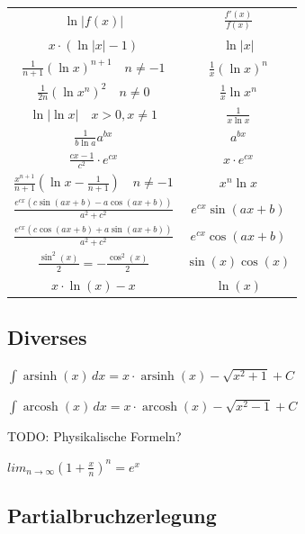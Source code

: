 \begin{center}
\begin{tabular}{c||c}
                $ \ln {| f(x) |} $   &   $ \frac{f'(x)}{f(x)} $ \\
                $ x \cdot (\ln |x| - 1) $  &  $ \ln |x| $ \\
                $ \frac{1}{n+1} (\ln x)^{n+1} \quad \scriptstyle  n \neq -1 $  &  $ \frac{1}{x}(\ln x)^n $ \\
                $ \frac{1}{2n} (\ln x^n)^{2} \quad \scriptstyle  n \neq 0 $  &  $ \frac{1}{x}\ln x^n $ \\
                $ \ln |\ln x| \quad \scriptstyle x>0,x\neq 1 $  &  $ \frac{1}{x \ln x} $ \\
                $ \frac{1}{b \ln a} a^{bx} $  &  $ a^{bx} $ \\
                $ \frac{cx-1}{c^2} \cdot e^{cx} $  &  $ x\cdot e^{cx} $ \\
                $ \frac{x^{n+1}}{n+1} \left( \ln x - \frac{1}{n+1} \right) \quad \scriptstyle  n \neq -1 $  &  $ x^n \ln x $ \\
                $ \frac{e^{cx} \left( c \sin (ax+b)-a \cos(ax+b) \right)}{a^2+c^2}  $  &  $ \scriptstyle e^{cx} \sin (ax+b)  $ \\
                $ \frac{e^{cx} \left( c \cos (ax+b)+a \sin(ax+b) \right)}{a^2+c^2}  $ &  $ \scriptstyle e^{cx} \cos (ax+b)  $ \\
                $ \frac{\sin^2(x)}{2} = -\frac{\cos^2(x)}{2}  $ &  $ \sin(x)\cos(x) $ \\
                $ x \cdot \ln(x)-x $ & $ \ln(x) $\\
        \end{tabular}
\end{center}

\subsection{Diverses}

$\int \operatorname{arsinh}(x)\,dx = x \cdot \operatorname{arsinh}(x) - \sqrt{x^2 + 1} + C$

$\int \operatorname{arcosh}(x)\,dx = x \cdot \operatorname{arcosh}(x) - \sqrt{x^2 - 1} + C$

TODO: Physikalische Formeln?

$lim_{n \rightarrow \infty}(1 + \frac{x}{n})^n = e^x$

\subsection{Partialbruchzerlegung}

